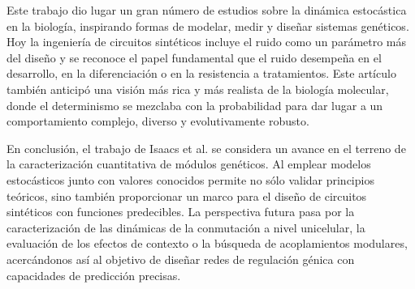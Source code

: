 \documentclass[nochap]{config/ejercicios}
\begin{document}

Este trabajo dio lugar un gran número de estudios sobre la dinámica estocástica en la biología, inspirando formas de modelar, medir y diseñar sistemas genéticos. Hoy la ingeniería de circuitos sintéticos incluye el ruido como un parámetro más del diseño y se reconoce el papel fundamental que el ruido desempeña en el desarrollo, en la diferenciación o en la resistencia a tratamientos. Este artículo también anticipó una visión más rica y más realista de la biología molecular, donde el determinismo se mezclaba con la probabilidad para dar lugar a un comportamiento complejo, diverso y evolutivamente robusto.


En conclusión, el trabajo de Isaacs et al. se considera un avance en el terreno de la caracterización cuantitativa de módulos genéticos. Al emplear modelos estocásticos junto con valores conocidos permite no sólo validar principios teóricos, sino también proporcionar un marco para el diseño de circuitos sintéticos con funciones predecibles. La perspectiva futura pasa por la caracterización de las dinámicas de la conmutación a nivel unicelular, la evaluación de los efectos de contexto o la búsqueda de acoplamientos modulares, acercándonos así al objetivo de diseñar redes de regulación génica con capacidades de predicción precisas.

\printbibliography
\end{document}

